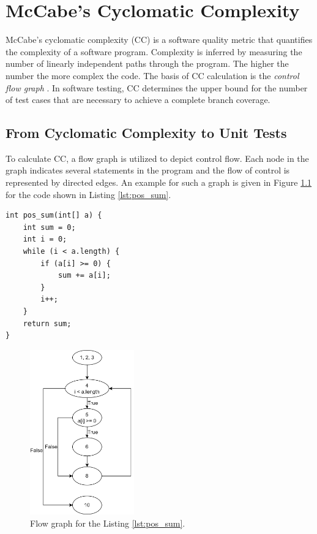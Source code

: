 \chapter{McCabe's Cyclomatic Complexity}
McCabe's cyclomatic complexity (CC) is a software quality metric that quantifies the complexity of a software program. Complexity is inferred by measuring the number of linearly independent paths through the program. The higher the number the more complex the code. The basis of CC calculation is the \emph{control flow graph} \autocite{spillner2021software}. In software testing, CC determines the upper bound for the number of test cases that are necessary to achieve a complete branch coverage.

\section{From Cyclomatic Complexity to Unit Tests}
To calculate CC, a flow graph is utilized to depict control flow. Each node in the graph indicates several statements in the program and the flow of control is represented by directed edges. An example for such a graph is given in Figure \ref{fig:flow-graph-eg} for the code shown in Listing \ref{lst:pos_sum}.

\begin{lstlisting}[caption={pos\_sum finds the sum of all positive numbers stored in an integer array a. Input parameter is a, an array of integers. The output of the function is sum, the sum of integers inside the array a.},label=lst:pos_sum]
int pos_sum(int[] a) {
    int sum = 0;
    int i = 0;
    while (i < a.length) {
        if (a[i] >= 0) {
            sum += a[i];
        }
        i++;
    }
    return sum;
}
\end{lstlisting}

\begin{figure}[H]
    \centering
    \includegraphics[width=0.4\textwidth]{images/flow-graph-eg.png}
    \caption{Flow graph for the Listing \ref{lst:pos_sum}.}
    \label{fig:flow-graph-eg}
\end{figure}

